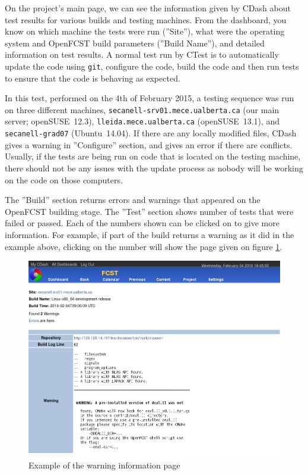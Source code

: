 On the project's main page, we can see the information given by CDash about test results for various builds and testing machines. From the dashboard, you know on which machine the tests were run (''Site''), what were the operating system and OpenFCST build parameters (''Build Name''), and detailed information on test results. A normal test run by CTest is to automatically update the code using \verb!git!, configure the code, build the code and then run tests to ensure that the code is behaving as expected.

In this test, performed on the 4th of February 2015, a testing sequence was run on three different machines, \verb!secanell-srv01.mece.ualberta.ca! (our main server; openSUSE~12.3), \verb!lleida.mece.ualberta.ca! (openSUSE~13.1), and \verb!secanell-grad07! (Ubuntu~14.04). If there are any locally modified files, CDash gives a warning in ''Configure'' section, and gives an error if there are conflicts. Usually, if the tests are being run on code that is located on the testing machine, there should not be any issues with the update process as nobody will be working on the code on those computers.

The ''Build'' section returns errors and warnings that appeared on the OpenFCST building stage. The ''Test'' section shows number of tests that were failed or passed. Each of the numbers shown can be clicked on to give more information. For example, if part of the build returns a warning as it did in the example above, clicking on the number will show the page given on figure \ref{fig:cdash_warning}.

\begin{figure}[!h]
\centering
\includegraphics[width=1\textwidth]{figures/CDash/cdash_warning.png}
\caption{Example of the warning information page}
\label{fig:cdash_warning}
\end{figure}

